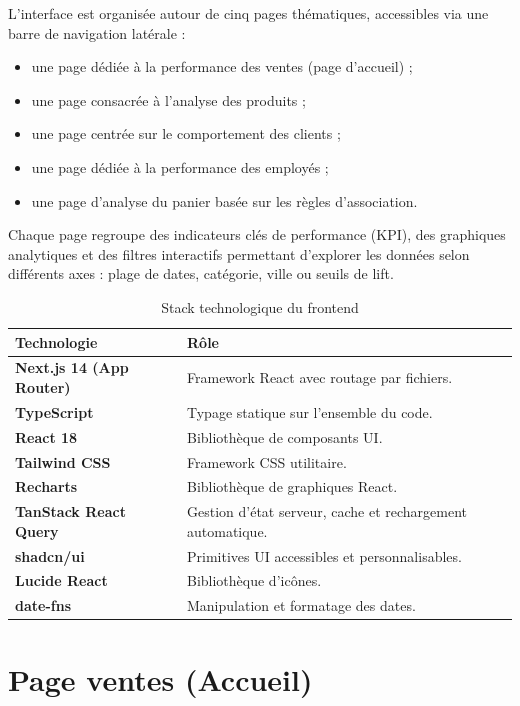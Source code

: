 \documentclass[12pt,a4paper,twoside]{report}
\begin{document}
L'interface est organisée autour de cinq pages thématiques, accessibles via une barre de navigation latérale :

\begin{itemize}
  \item une page dédiée à la performance des ventes (page d'accueil) ;
  \item une page consacrée à l'analyse des produits ;
  \item une page centrée sur le comportement des clients ;
  \item une page dédiée à la performance des employés ;
  \item une page d'analyse du panier basée sur les règles d'association.
\end{itemize}

Chaque page regroupe des indicateurs clés de performance (KPI), des graphiques analytiques et des filtres interactifs permettant d'explorer les données selon différents axes : plage de dates, catégorie, ville ou seuils de lift.

\begin{table}[H]
\centering
{}
\begin{tabularx}{\textwidth}{>{\bfseries}p{3cm}X}
\toprule
\rowcolor{TableHeader}
\color{white}Technologie & \color{white}Rôle \\
\midrule
Next.js 14 (App Router) & Framework React avec routage par fichiers. \\
TypeScript & Typage statique sur l'ensemble du code. \\
React 18 & Bibliothèque de composants UI. \\
Tailwind CSS & Framework CSS utilitaire. \\
Recharts & Bibliothèque de graphiques React. \\
TanStack React Query & Gestion d'état serveur, cache et rechargement automatique. \\
shadcn/ui & Primitives UI accessibles et personnalisables. \\
Lucide React & Bibliothèque d'icônes. \\
date-fns & Manipulation et formatage des dates. \\
\bottomrule
\end{tabularx}
\caption{Stack technologique du frontend}
\label{tab:frontend-stack}
\end{table}

\section{Page ventes (Accueil)}
\end{document}
